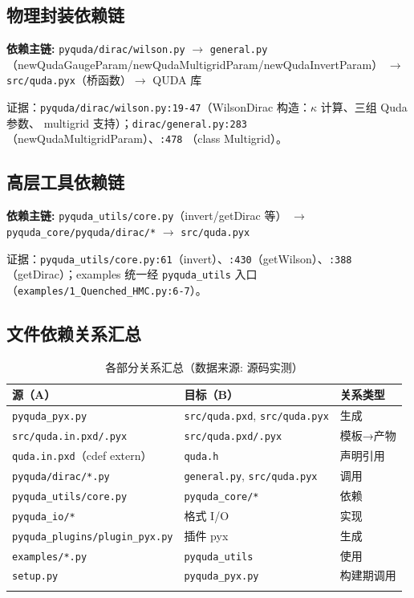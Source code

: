 \documentclass[UTF8]{ctexart}
\begin{document}
\subsection{物理封装依赖链}
\begin{keybox}
\textbf{依赖主链:} \textcolor{relation}{\texttt{pyquda/dirac/wilson.py}
$\rightarrow$ \texttt{general.py}（newQudaGaugeParam/newQudaMultigridParam/newQudaInvertParam）
$\rightarrow$ \texttt{src/quda.pyx}（桥函数）$\rightarrow$ QUDA 库}
\end{keybox}
证据：\texttt{pyquda/dirac/wilson.py:19-47}（WilsonDirac 构造：$\kappa$ 计算、三组 Quda 参数、
multigrid 支持）；\texttt{dirac/general.py:283}（newQudaMultigridParam）、\texttt{:478}
（class Multigrid）。

\subsection{高层工具依赖链}
\begin{keybox}
\textbf{依赖主链:} \textcolor{relation}{\texttt{pyquda\_utils/core.py}（invert/getDirac 等）
$\rightarrow$ \texttt{pyquda\_core/pyquda/dirac/*} $\rightarrow$ \texttt{src/quda.pyx}}
\end{keybox}
证据：\texttt{pyquda\_utils/core.py:61}（invert）、\texttt{:430}（getWilson）、\texttt{:388}
（getDirac）；examples 统一经 \texttt{pyquda\_utils} 入口（\texttt{examples/1\_Quenched\_HMC.py:6-7}）。

\subsection{文件依赖关系汇总}
\begin{xltabular}{\textwidth}{lXX}
\toprule
\textcolor{relation}{源（A）} & 目标（B） & 关系类型 \\
\midrule
\endhead
\texttt{pyquda\_pyx.py} & \texttt{src/quda.pxd}, \texttt{src/quda.pyx} & 生成 \\
\texttt{src/quda.in.pxd/.pyx} & \texttt{src/quda.pxd/.pyx} & 模板→产物 \\
\texttt{quda.in.pxd}（cdef extern）& \texttt{quda.h} & 声明引用 \\
\texttt{pyquda/dirac/*.py} & \texttt{general.py}, \texttt{src/quda.pyx} & 调用 \\
\texttt{pyquda\_utils/core.py} & \texttt{pyquda\_core/*} & 依赖 \\
\texttt{pyquda\_io/*} & 格式 I/O & 实现 \\
\texttt{pyquda\_plugins/plugin\_pyx.py} & 插件 pyx & 生成 \\
\texttt{examples/*.py} & \texttt{pyquda\_utils} & 使用 \\
\texttt{setup.py} & \texttt{pyquda\_pyx.py} & 构建期调用 \\
\bottomrule
\caption{各部分关系汇总（数据来源: 源码实测）}
\end{xltabular}
\end{document}
